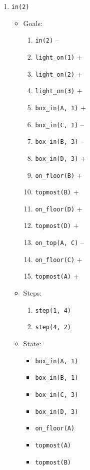 \documentclass[12pt]{article}
\begin{document}
\begin{enumerate}
\begin{itemize}
\begin{itemize}
        \end{itemize}
    \end{itemize}
  \item \texttt{in(2)}
    \begin{itemize}
      \item Goals:
        \begin{enumerate}
          \item \texttt{in(2)} --
          \item \texttt{light\_on(1)} +
          \item \texttt{light\_on(2)} +
          \item \texttt{light\_on(3)} +
          \item \texttt{box\_in(A, 1)} +
          \item \texttt{box\_in(C, 1)} --
          \item \texttt{box\_in(B, 3)} --
          \item \texttt{box\_in(D, 3)} +
          \item \texttt{on\_floor(B)} +
          \item \texttt{topmost(B)} +
          \item \texttt{on\_floor(D)} +
          \item \texttt{topmost(D)} +
          \item \texttt{on\_top(A, C)} --
          \item \texttt{on\_floor(C)} +
          \item \texttt{topmost(A)} +
        \end{enumerate}
      \item Steps:
        \begin{enumerate}
          \item \texttt{step(1, 4)}
          \item \texttt{step(4, 2)}
        \end{enumerate}
      \item State:
        \begin{itemize}
          \item \texttt{box\_in(A, 1)}
          \item \texttt{box\_in(B, 1)}
          \item \texttt{box\_in(C, 3)}
          \item \texttt{box\_in(D, 3)}
          \item \texttt{on\_floor(A)}
          \item \texttt{topmost(A)}
          \item \texttt{topmost(B)}

\end{itemize}
\end{itemize}
\end{enumerate}
\end{document}
